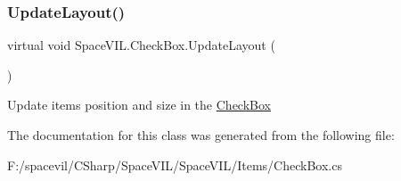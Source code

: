 \mbox{\label{class_space_v_i_l_1_1_check_box_a03402e85defa2b269c933b9000d70835}} 
\subsubsection{\texorpdfstring{Update\+Layout()}{UpdateLayout()}}
{\footnotesize\ttfamily virtual void Space\+V\+I\+L.\+Check\+Box.\+Update\+Layout (\begin{DoxyParamCaption}{ }\end{DoxyParamCaption})\hspace{0.3cm}{\ttfamily [virtual]}}



Update items position and size in the \mbox{\hyperlink{class_space_v_i_l_1_1_check_box}{Check\+Box}} 



The documentation for this class was generated from the following file\+:\begin{DoxyCompactItemize}
\item 
F\+:/spacevil/\+C\+Sharp/\+Space\+V\+I\+L/\+Space\+V\+I\+L/\+Items/Check\+Box.\+cs\end{DoxyCompactItemize}
